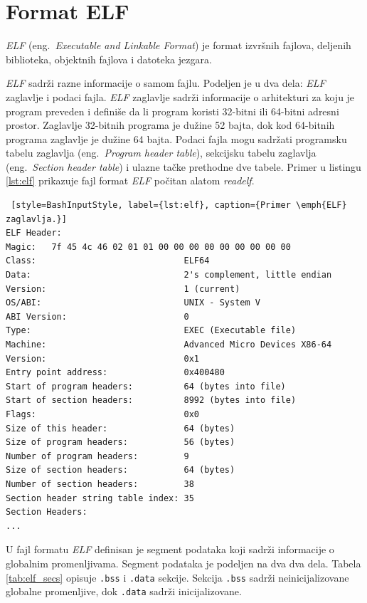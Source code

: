 \documentclass[12pt,oneside]{memoir}
\begin{document}

\section{Format ELF}

\emph{ELF} (eng.~\emph{Executable and Linkable Format}) \cite{ELF} je format izvršnih fajlova, deljenih biblioteka, objektnih fajlova i datoteka jezgara.

\emph{ELF} sadrži razne informacije o samom fajlu. Podeljen je u dva dela: \emph{ELF} zaglavlje i podaci fajla. \emph{ELF} zaglavlje sadrži informacije o arhitekturi za koju je program preveden i definiše da li program koristi 32-bitni ili 64-bitni adresni prostor. Zaglavlje 32-bitnih programa je dužine 52 bajta, dok kod 64-bitnih programa zaglavlje je dužine 64 bajta. Podaci fajla mogu sadržati programsku tabelu zaglavlja (eng.~\emph{Program header table}), sekcijsku tabelu zaglavlja (eng.~\emph{Section header table}) i ulazne tačke prethodne dve tabele. Primer u listingu \ref{lst:elf} prikazuje fajl format \emph{ELF} počitan alatom \emph{readelf}.

\begin{lstlisting} [style=BashInputStyle, label={lst:elf}, caption={Primer \emph{ELF} zaglavlja.}]
ELF Header:
Magic:   7f 45 4c 46 02 01 01 00 00 00 00 00 00 00 00 00 
Class:                             ELF64
Data:                              2's complement, little endian
Version:                           1 (current)
OS/ABI:                            UNIX - System V
ABI Version:                       0
Type:                              EXEC (Executable file)
Machine:                           Advanced Micro Devices X86-64
Version:                           0x1
Entry point address:               0x400480
Start of program headers:          64 (bytes into file)
Start of section headers:          8992 (bytes into file)
Flags:                             0x0
Size of this header:               64 (bytes)
Size of program headers:           56 (bytes)
Number of program headers:         9
Size of section headers:           64 (bytes)
Number of section headers:         38
Section header string table index: 35
Section Headers:
...
\end{lstlisting}

U fajl formatu \emph{ELF} definisan je segment podataka koji sadrži informacije o globalnim promenljivama. Segment podataka je podeljen na dva dva dela. Tabela \ref{tab:elf_secs} opisuje \texttt{.bss} i \texttt{.data} sekcije. Sekcija \texttt{.bss} sadrži neinicijalizovane globalne promenljive, dok \texttt{.data} sadrži inicijalizovane. 
\end{document}
